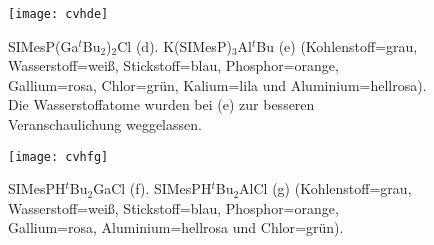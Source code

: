 \begin{figure}[ht!]
	\centering
	\texttt{[image: cvhde]}
	\captionsetup{figurewithin = chapter}
	\captionsetup{font=small, labelfont=bf}\caption[{Abbildung von SIMesP(Ga$^\textit{t}$Bu$_2$)$_2$Cl und K(SIMesP)$_3$Al$^\textit{t}$Bu}]{SIMesP(Ga$^\textit{t}$Bu$_2$)$_2$Cl (d). K(SIMesP)$_3$Al$^\textit{t}$Bu (e) (Kohlenstoff=grau, Wasserstoff=weiß, Stickstoff=blau, Phosphor=orange, Gallium=rosa, Chlor=grün, Kalium=lila und Aluminium=hellrosa). Die Wasserstoffatome wurden bei (e) zur besseren Veranschaulichung weggelassen.}
\label{abb:cvhde}
\end{figure}

\begin{figure}[ht!]
	\centering
	\texttt{[image: cvhfg]}
	\captionsetup{figurewithin = chapter}
	\captionsetup{font=small, labelfont=bf}\caption[{Abbildung von SIMesPH$^\textit{t}$Bu$_2$GaCl und SIMesPH$^\textit{t}$Bu$_2$AlCl}]{SIMesPH$^\textit{t}$Bu$_2$GaCl (f). SIMesPH$^\textit{t}$Bu$_2$AlCl (g) (Kohlenstoff=grau, Wasserstoff=weiß, Stickstoff=blau, Phosphor=orange, Gallium=rosa, Aluminium=hellrosa und Chlor=grün).}
\label{abb:cvhfg}
\end{figure}


%
%

